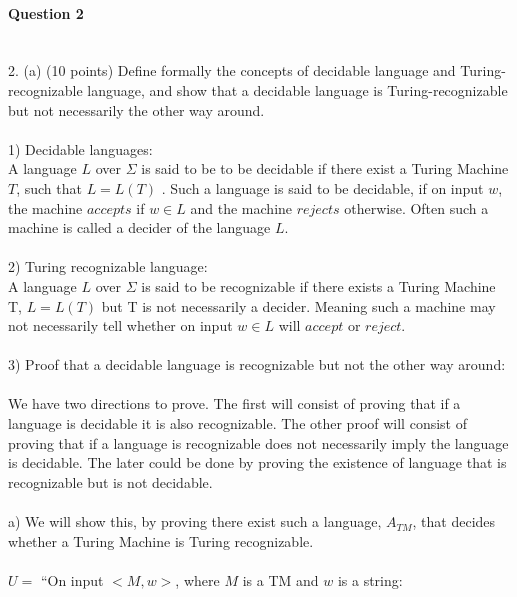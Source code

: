 \documentclass{report}
\newcommand{\me}[1]{
\begin{math}
#1
\end{math}
}
\begin{document}
\paragraph{\Large{Question 2\\ \\}}
2. (a) (10 points) Define formally the concepts of decidable language and Turing-recognizable language, and show that a decidable language is Turing-recognizable but not necessarily the other way around.  \\  \\
1) Decidable languages:\\  A language $L$ over $\Sigma$ is said to be to be decidable if there exist a Turing Machine $T$, such that \me{L = L(T) }. Such a language is said to be decidable, if on input $w$, the machine $accepts$ if $w \in L$ and the machine $rejects$ otherwise.  Often such a machine is called a decider of the language $L$.  \\ \\
2) Turing recognizable language: \\A language $L$ over $\Sigma$ is said to be recognizable if there exists a Turing Machine T, \me{L =L(T)} but T is not necessarily a decider. Meaning such a machine may not necessarily tell whether on input $w \in L$ will $accept$ or 
$reject$. \\ \\3) Proof that a decidable language is recognizable but not the other way around: \\\\ We have two directions to prove. The first will consist of proving that if a language is decidable it is also recognizable. The other proof will consist of proving that if a language is recognizable does not necessarily imply the language is decidable. The later could be done by proving the existence of language that is recognizable but is not decidable. \\ \\
a) We will show this, by proving there exist such a language, $A_{TM}$, that decides whether a Turing Machine is Turing recognizable. \\ \\
$U =$  ``On  input $<M,w>$, where $M$ is a TM and $w$ is a string: \\
\end{document}
